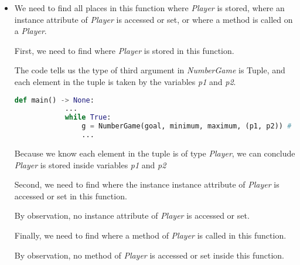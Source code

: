 \documentclass[12pt]{article}
\begin{document}
\begin{enumerate}[1.]
    \bigskip

    \begin{itemize}
        \item

        We need to find all places in this function where \textit{Player} is stored,
        where an instance attribute of \textit{Player} is accessed or set, or where
        a method is called on a \textit{Player}.

        \bigskip

        First, we need to find where \textit{Player} is stored in this function.

        \bigskip

        The code tells us the type of third argument in \textit{NumberGame}
        is Tuple, and each element in the tuple is taken by the variables \textit{p1}
        and \textit{p2}.

        \bigskip

        \begin{lstlisting}[language=Python]
        def main() -> None:
            ...
            while True:
                g = NumberGame(goal, minimum, maximum, (p1, p2)) # <- Here!!
                ...
        \end{lstlisting}

        \bigskip

        Because we know each element in the tuple is of type \textit{Player}, we can
        conclude \textit{Player} is stored inside variables \textit{p1} and
        \textit{p2}

        \bigskip

        Second, we need to find where the instance instance attribute of
        \textit{Player} is accessed or set in this function.

        \bigskip

        By observation, no instance attribute of \textit{Player} is accessed
        or set.

        \bigskip

        Finally, we need to find where a method of \textit{Player} is called
        in this function.

        \bigskip

        By observation, no method of \textit{Player} is accessed or set inside this function.

    \end{itemize}

    \bigskip


\end{enumerate}
\end{document}
